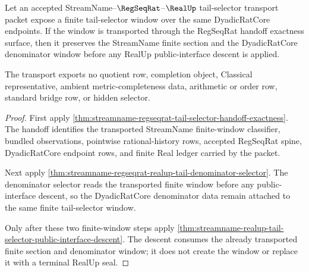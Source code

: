 \begin{theorem}
\label{thm:streamname-tail-selector-window-transport}
Let an accepted StreamName--$\RegSeqRat$--$\RealUp$ tail-selector transport packet expose a finite tail-selector window over the same DyadicRatCore endpoints. If the window is transported through the RegSeqRat handoff exactness surface, then it preserves the StreamName finite section and the DyadicRatCore denominator window before any RealUp public-interface descent is applied.

The transport exports no quotient row, completion object, Classical representative, ambient metric-completeness data, arithmetic or order row, standard bridge row, or hidden selector.
\end{theorem}
\begin{proof}
First apply \autoref{thm:streamname-regseqrat-tail-selector-handoff-exactness}. The handoff identifies the transported StreamName finite-window classifier, bundled observations, pointwise rational-history rows, accepted RegSeqRat spine, DyadicRatCore endpoint rows, and finite Real ledger carried by the packet.

Next apply \autoref{thm:streamname-regseqrat-realup-tail-denominator-selector}. The denominator selector reads the transported finite window before any public-interface descent, so the DyadicRatCore denominator data remain attached to the same finite tail-selector window.

Only after these two finite-window steps apply \autoref{thm:streamname-realup-tail-selector-public-interface-descent}. The descent consumes the already transported finite section and denominator window; it does not create the window or replace it with a terminal RealUp seal.
\end{proof}
